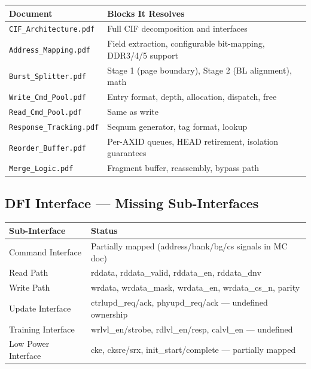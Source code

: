 \documentclass[10pt,a4paper]{article}
\newcommand{\Th}[1]{\cellcolor{thbg}\textbf{\small\color{acc1}#1}}
\newcommand{\RA}{\rowcolor{white}}
\newcommand{\RB}{\rowcolor{altbg}}
\begin{document}
\begin{center}
\begin{tabularx}{\linewidth}{@{} l l @{}}
\toprule
\Th{Document} & \Th{Blocks It Resolves} \\
\midrule
\RA \texttt{CIF\_Architecture.pdf}         & Full CIF decomposition and interfaces \\
\RB \texttt{Address\_Mapping.pdf}          & Field extraction, configurable bit-mapping, DDR3/4/5 support \\
\RA \texttt{Burst\_Splitter.pdf}           & Stage 1 (page boundary), Stage 2 (BL alignment), math \\
\RB \texttt{Write\_Cmd\_Pool.pdf}          & Entry format, depth, allocation, dispatch, free \\
\RA \texttt{Read\_Cmd\_Pool.pdf}           & Same as write \\
\RB \texttt{Response\_Tracking.pdf}        & Seqnum generator, tag format, lookup \\
\RA \texttt{Reorder\_Buffer.pdf}           & Per-AXID queues, HEAD retirement, isolation guarantees \\
\RB \texttt{Merge\_Logic.pdf}              & Fragment buffer, reassembly, bypass path \\
\bottomrule
\end{tabularx}
\end{center}

\subsection{DFI Interface --- Missing Sub-Interfaces}

\begin{center}
\begin{tabularx}{\linewidth}{@{} l X @{}}
\toprule
\Th{Sub-Interface} & \Th{Status} \\
\midrule
\RA Command Interface   & Partially mapped (address/bank/bg/cs signals in MC doc) \\
\RB Read Path           & rddata, rddata\_valid, rddata\_en, rddata\_dnv \\
\RA Write Path          & wrdata, wrdata\_mask, wrdata\_en, wrdata\_cs\_n, parity \\
\RB Update Interface    & ctrlupd\_req/ack, phyupd\_req/ack --- undefined ownership \\
\RA Training Interface  & wrlvl\_en/strobe, rdlvl\_en/resp, calvl\_en --- undefined \\
\RB Low Power Interface & cke, cksre/srx, init\_start/complete --- partially mapped \\
\bottomrule
\end{tabularx}
\end{center}
\end{document}
